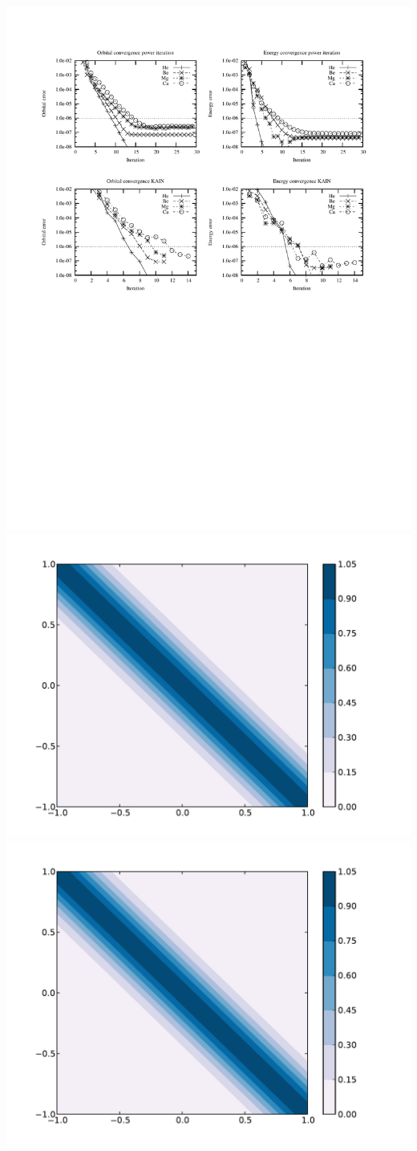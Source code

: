 \documentclass [a4paper, landscape]{report}
\begin{document}
\includegraphics[scale=0.2, clip, viewport = 100 000 370 262]{../accuracy.pdf}
\includegraphics[scale=0.2, clip, viewport = 100 100 370 362]{sparsematrix.pdf}
\includegraphics[scale=0.2, clip, viewport = 100 100 370 362]{sparsematrix.pdf}\\
\end{document}
